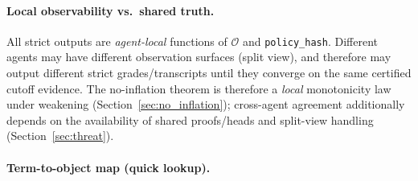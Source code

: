 \documentclass[11pt]{article}
\newcommand{\code}[1]{\texttt{#1}}
\newcommand{\1}{\mathbf{1}}
\theoremstyle{definition}
\theoremstyle{plain}
\begin{document}
\paragraph{Local observability vs.\ shared truth.}
All strict outputs are \emph{agent-local} functions of $\mathcal{O}$ and \code{policy\_hash}.
Different agents may have different observation surfaces (split view), and therefore may output different strict grades/transcripts until they converge on the same certified cutoff evidence.
The no-inflation theorem is therefore a \emph{local} monotonicity law under weakening (Section~\ref{sec:no_inflation}); cross-agent agreement additionally depends on the availability of shared proofs/heads and split-view handling (Section~\ref{sec:threat}).

\paragraph{Term-to-object map (quick lookup).}
\end{document}
